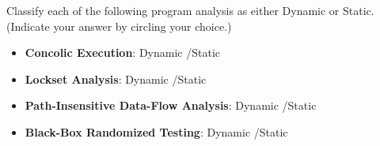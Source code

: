 \documentclass[addpoints, answers]{exam}
\begin{document}
\begin{questions}



\question[4] Classify each of the following program analysis as either
  Dynamic or Static. (Indicate your answer by circling your choice.) \\

  \begin{itemize}
  \item \textbf{Concolic Execution}: Dynamic \quad/\quad Static
    \\[24pt]
  \item \textbf{Lockset Analysis}: Dynamic \quad/\quad Static
    \\[24pt]
  \item \textbf{Path-Insensitive Data-Flow Analysis}: Dynamic \quad/\quad Static
    \\[24pt]
  \item \textbf{Black-Box Randomized Testing}: Dynamic \quad/\quad Static \\[24pt]
  \end{itemize}


\end{questions}
\end{document}
